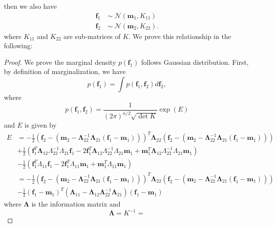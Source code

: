 \documentclass[11pt,a4paper]{article}
\theoremstyle{definition}
\numberwithin{equation}{section}
\let\vec\mathbf
\begin{document}
then we also have 
\begin{equation*} \label{}
\begin{split}
\vec f_1\ & \sim \ \mathcal N \left(\vec m_1 , K_{11} \right)\\
\vec f_2\ & \sim \ \mathcal N \left(\vec m_2 , K_{22} \right).
\end{split}
\end{equation*}
where $K_{11}$ and  $K_{22}$ are sub-matrices of $K$. We prove this relationship in the following:
\begin{proof}
	We prove the marginal density $p(\vec f_1)$ follows Gaussian distribution. First, by definition of marginalization, we have
	\begin{equation*} \label{}
	p(\vec f_1) = \int p(\vec f_1,\vec f_2)d \vec f_2,
	\end{equation*}
	where 
	\begin{equation*} \label{}
	p(\vec f_1,\vec f_2) = \frac{1}{(2\pi)^{n/2}\sqrt{\det K}}\exp{(E)}
	\end{equation*}
	and $E$ is given by
		\begin{equation*} \label{}
		\begin{split}
		E &= -\frac{1}{2}\left(\vec f_2-(\vec m_2 - \vec\Lambda_{22}^{-1} \vec\Lambda_{21}(\vec f_1 - \vec m_1))\right)^T\vec\Lambda_{22}\left(\vec f_2-(\vec m_2 - \vec\Lambda_{22}^{-1} \vec\Lambda_{21}(\vec f_1 - \vec m_1))\right)\\
		&+\frac{1}{2}\left(\vec f_1^T \vec\Lambda_{12}\Lambda_{22}^{-1}\Lambda_{21}\vec f_1 - 2\vec f_1^T \vec\Lambda_{12}\Lambda_{22}^{-1}\Lambda_{21}\vec m_1 + \vec m_1^T \vec\Lambda_{12}\Lambda_{22}^{-1}\Lambda_{21}\vec m_1\right)\\
		&-\frac{1}{2}\left(\vec f_1^T\Lambda_{11}\vec f_1 - 2\vec f_1^T\Lambda_{11}\vec m_1 + \vec m_1^T\Lambda_{11}\vec m_1\right)\\
		&=-\frac{1}{2}\left(\vec f_2-(\vec m_2 - \vec\Lambda_{22}^{-1} \vec\Lambda_{21}(\vec f_1 - \vec m_1))\right)^T\vec\Lambda_{22}\left(\vec f_2-(\vec m_2 - \vec\Lambda_{22}^{-1} \vec\Lambda_{21}(\vec f_1 - \vec m_1))\right)\\
		&-\frac{1}{2}\left(\vec f_1 - \vec m_1\right)^T\left(\vec\Lambda_{11}-\vec\Lambda_{12}\vec\Lambda_{22}^{-1}\vec\Lambda_{21}\right)\left(\vec f_1 - \vec m _1 \right)
		\end{split}
		\end{equation*}
	where $\vec\Lambda$ is the information matrix and
	\begin{equation*} \label{}
	\vec \Lambda = K^{-1} = 

\end{equation*}
\end{proof}
\end{document}
